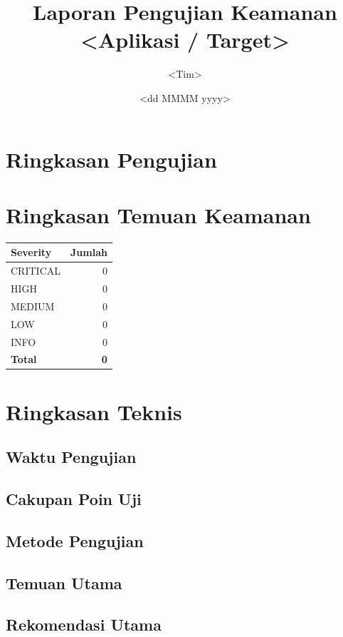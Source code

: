 \documentclass[11pt,a4paper]{article}
\title{Laporan Pengujian Keamanan\\\large <Aplikasi / Target>}
\author{<Tim>}
\date{<dd MMMM yyyy>}
\begin{document}
\maketitle
\tableofcontents
\newpage

\section{Ringkasan Pengujian}

\section{Ringkasan Temuan Keamanan}
\begin{table}[h]
\centering
\begin{tabular}{lr}
\toprule
\textbf{Severity} & \textbf{Jumlah} \\
\midrule
CRITICAL & 0 \\
HIGH     & 0 \\
MEDIUM   & 0 \\
LOW      & 0 \\
INFO     & 0 \\
\midrule
\textbf{Total} & \textbf{0} \\
\bottomrule
\end{tabular}
\end{table}

\section{Ringkasan Teknis}
\subsection{Waktu Pengujian}
\subsection{Cakupan Poin Uji}
\subsection{Metode Pengujian}
\subsection{Temuan Utama}
\subsection{Rekomendasi Utama}
\end{document}

